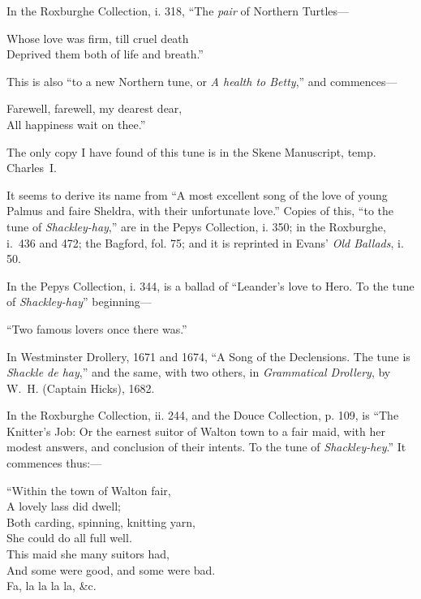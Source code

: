 In the Roxburghe Collection, i. 318, “The \textit{pair} of Northern Turtles—
\settowidth{\versewidth}{Deprived them both of life and breath.”}
\begin{scverse}
Whose love was firm, till cruel death\\
Deprived them both of life and breath.”
\end{scverse}

This is also “to a new Northern tune, or \textit{A health to Betty},” and commences—
\settowidth{\versewidth}{Farewell, farewell, my dearest dear}
\begin{scverse}
\begin{altverse}
Farewell, farewell, my dearest dear,\\
All happiness wait on thee.”
\end{altverse}
\end{scverse}





The only copy I have found of this tune is in the Skene Manuscript, temp.
Charles~I.

It seems to derive its name from “A most excellent song of the love of young
Palmus and faire Sheldra, with their unfortunate love.” Copies of this, “to the
tune of \textit{Shackley-hay},” are in the Pepys Collection, i. 350; in the Roxburghe,
i.~436 and 472; the Bagford, fol. 75; and it is reprinted in Evans’ \textit{Old
Ballads}, i. 50.

In the Pepys Collection, i. 344, is a ballad of “Leander’s love to Hero. To
the tune of \textit{Shackley-hay}” beginning—
\settowidth{\versewidth}{“Two famous lovers once there was.”}
\begin{scverse}
“Two famous lovers once there was.”
\end{scverse}

In Westminster Drollery, 1671 and 1674, “A Song of the Declensions. The
tune is \textit{Shackle de hay},” and the same, with two others, in \textit{Grammatical Drollery},
by W.~H. (Captain Hicks), 1682.

In the Roxburghe Collection, ii. 244, and the Douce Collection, p. 109, is
“The Knitter’s Job: Or the earnest suitor of Walton town to a fair maid, with
her modest answers, and conclusion of their intents. To the tune of \textit{Shackley-hey}.”
It commences thus:—
\begin{dcverse}
\begin{patverse}
“Within the town of Walton fair,\\
A lovely lass did dwell;\\
Both carding, spinning, knitting yarn,\\
She could do all full well.\\
This maid she many suitors had,\\
And some were good, and some were bad.\\
Fa, la la la la, \&c.
\end{patverse}
\end{dcverse}

